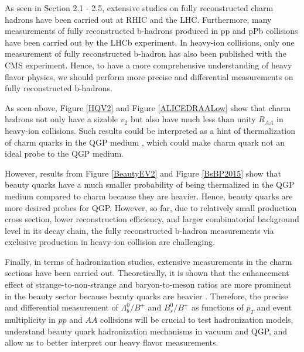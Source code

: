As seen in Section 2.1 - 2.5, extensive studies on fully reconstructed charm hadrons have been carried out at RHIC and the LHC. Furthermore, many measurements of fully reconstructed b-hadrons produced in pp and pPb collisions have been carried out by the LHCb experiment. In heavy-ion collisions, only one measurement of fully reconstructed b-hadron has also been published with the CMS experiment. Hence, to have a more comprehensive understanding of heavy flavor physics, we should perform more precise and differential measurements on fully reconstructed b-hadrons. 


As seen above, Figure \ref{HQV2} and Figure \ref{ALICEDRAALow} show that charm hadrons not only have a sizable $v_2$ but also have much less than unity $R_{AA}$ in heavy-ion collisions. Such results could be interpreted as a hint of thermalization of charm quarks in the QGP medium \cite{CharmThermal}, which could make charm quark not an ideal probe to the QGP medium. 

However, results from Figure \ref{BeautyEV2} and Figure \ref{BsBP2015} show that beauty quarks have a much smaller probability of being thermalized in the QGP medium compared to charm because they are heavier. Hence, beauty quarks are more desired probes for QGP. However, so far, due to relatively small production cross section, lower reconstruction efficiency, and larger combinatorial background level in its decay chain, the fully reconstructed b-hadron measurements via exclusive production in heavy-ion collision are challenging.

Finally, in terms of hadronization studies, extensive measurements in the charm sections have been carried out. Theoretically, it is shown that the enhancement effect of strange-to-non-strange and baryon-to-meson ratios are more prominent in the beauty sector because beauty quarks are heavier \cite{BaryontoMeson}. Therefore, the precise and differential measurement of $\Lambda_b^0/B^+$ and $B^0_s/B^+$ as functions of $p_T$ and event multiplicity in $pp$ and $AA$ collisions will be crucial to test hadronization models, understand beauty quark hadronization mechanisms in vacuum and QGP, and allow us to better interpret our heavy flavor measurements.

